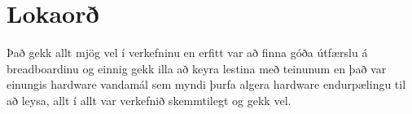 \section{Lokaorð}
Það gekk allt mjög vel í verkefninu en erfitt var að finna góða útfærslu á breadboardinu og einnig gekk illa að keyra lestina með teinunum en það var einungis hardware vandamál sem myndi þurfa algera hardware endurpælingu til að leysa, allt í allt var verkefnið skemmtilegt og gekk vel. 